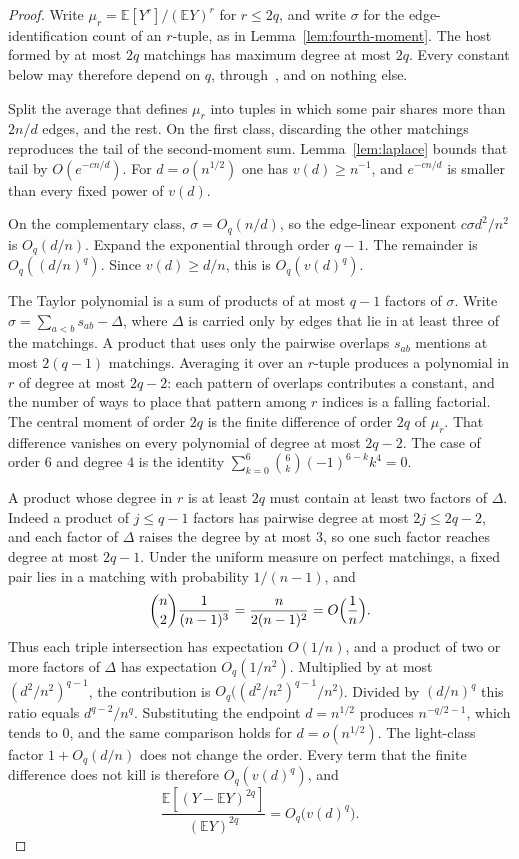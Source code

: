 \documentclass[11pt]{article}
\newcommand{\EE}{\mathbb{E}}
\begin{document}
\begin{proof}
Write \(\mu_r=\EE[Y^r]/(\EE Y)^r\) for \(r\le 2q\), and write \(\sigma\) for the
edge-identification count of an \(r\)-tuple, as in Lemma~\ref{lem:fourth-moment}.
The host formed by at most \(2q\) matchings has maximum degree at most \(2q\).
Every constant below may therefore depend on \(q\), through~\cite[Theorem~6]{Gao20},
and on nothing else.

Split the average that defines \(\mu_r\) into tuples in which some pair shares
more than \(2n/d\) edges, and the rest. On the first class, discarding the other
matchings reproduces the tail of the second-moment sum. Lemma~\ref{lem:laplace}
bounds that tail by \(O(e^{-cn/d})\). For \(d=o(n^{1/2})\) one has
\(v(d)\ge n^{-1}\), and \(e^{-cn/d}\) is smaller than every fixed power of
\(v(d)\).

On the complementary class, \(\sigma=O_q(n/d)\), so the edge-linear exponent
\(c\sigma d^2/n^2\) is \(O_q(d/n)\). Expand the exponential through order \(q-1\).
The remainder is \(O_q((d/n)^q)\). Since \(v(d)\ge d/n\), this is \(O_q(v(d)^q)\).

The Taylor polynomial is a sum of products of at most \(q-1\) factors of
\(\sigma\). Write \(\sigma=\sum_{a<b}s_{ab}-\Delta\), where \(\Delta\) is carried
only by edges that lie in at least three of the matchings. A product that uses
only the pairwise overlaps \(s_{ab}\) mentions at most \(2(q-1)\) matchings.
Averaging it over an \(r\)-tuple produces a polynomial in \(r\) of degree at most
\(2q-2\): each pattern of overlaps contributes a constant, and the number of
ways to place that pattern among \(r\) indices is a falling factorial.
The central moment of order \(2q\) is the finite difference of order \(2q\) of
\(\mu_r\). That difference vanishes on every polynomial of degree at most
\(2q-2\). The case of order \(6\) and degree \(4\) is the identity
\(\sum_{k=0}^{6}\binom{6}{k}(-1)^{6-k}k^4=0\).

A product whose degree in \(r\) is at least \(2q\) must contain at least two
factors of \(\Delta\). Indeed a product of \(j\le q-1\) factors has pairwise
degree at most \(2j\le 2q-2\), and each factor of \(\Delta\) raises the degree
by at most \(3\), so one such factor reaches degree at most \(2q-1\).
Under the uniform measure on perfect matchings, a fixed pair lies in a matching
with probability \(1/(n-1)\), and
\[
\binom{n}{2}\frac1{(n-1)^3}
=
\frac{n}{2(n-1)^2}
=
O\Bigl(\frac1n\Bigr).
\]
Thus each triple intersection has expectation \(O(1/n)\), and a product of two
or more factors of \(\Delta\) has expectation \(O_q(1/n^2)\). Multiplied by at
most \((d^2/n^2)^{q-1}\), the contribution is \(O_q\bigl((d^2/n^2)^{q-1}/n^2\bigr)\).
Divided by \((d/n)^q\) this ratio equals \(d^{q-2}/n^q\). Substituting the
endpoint \(d=n^{1/2}\) produces \(n^{-q/2-1}\), which tends to \(0\), and the
same comparison holds for \(d=o(n^{1/2})\). The light-class factor
\(1+O_q(d/n)\) does not change the order. Every term that the finite difference
does not kill is therefore \(O_q(v(d)^q)\), and
\[
\frac{\EE[(Y-\EE Y)^{2q}]}{(\EE Y)^{2q}}=O_q\bigl(v(d)^q\bigr).
\]
\end{proof}
\end{document}
